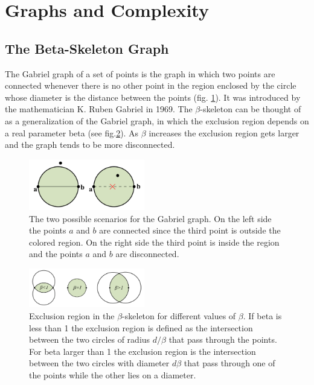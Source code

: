 \documentclass[fleqn,usenatbib]{mnras}
\begin{document}
\section{Graphs and Complexity}

\subsection{The Beta-Skeleton Graph}

The Gabriel graph of a set of points is the graph in which two points
are connected whenever there is no other point in the region enclosed
by the circle whose diameter is the distance between the points
(fig. \ref{fig:gabriel}).   
It was introduced by the mathematician K. Ruben Gabriel in 1969. 
The $\beta$-skeleton can be thought of as a generalization of the
Gabriel graph, in which the exclusion region depends on a real
parameter beta (see fig.\ref{fig:bskeleton_area}).   
As $\beta$ increases the exclusion  region gets larger and the graph tends to be
more disconnected.  

\begin{figure}
    \centering
    \includegraphics[width=0.45\textwidth]{gabriel.pdf}
    \caption{The two possible scenarios for the Gabriel graph. On the left side the points $a$ and $b$ are connected since the third point is outside the colored region. On the right side the third point is inside the region and the points $a$ and $b$ are disconnected.}
    \label{fig:gabriel}
\end{figure}
\begin{figure}
    \centering
    \includegraphics[width=0.45\textwidth]{betaskeleton.pdf}
    \caption{Exclusion region in the $\beta$-skeleton for different values of $\beta$. If beta is less than 1 the exclusion region is defined as the intersection between the two circles of radius $d/\beta$ that pass through the points. For beta larger than 1 the exclusion region is the intersection between the two circles with diameter $d\beta$ that pass through one of the points while the other lies on a diameter.}
    \label{fig:bskeleton_area}
\end{figure}
\end{document}
